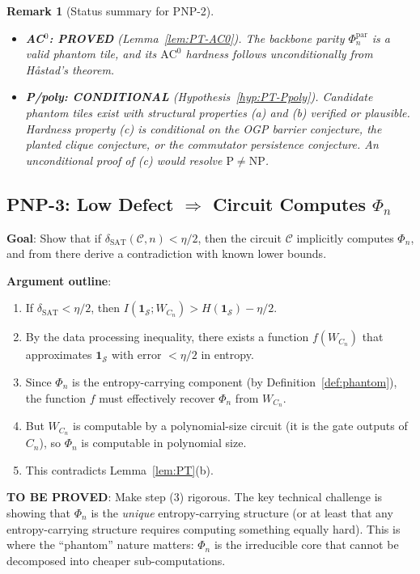 \documentclass[11pt]{article}
\newtheorem{remark}[lemma]{Remark}
\theoremstyle{definition}
\begin{document}
\begin{remark}[Status summary for PNP-2]
\label{rem:PNP2-status}
\begin{itemize}
  \item \textbf{AC$^0$: PROVED} (Lemma~\ref{lem:PT-AC0}).
    The backbone parity $\Phi_n^{\mathrm{par}}$ is a valid phantom tile, and its
    $\mathrm{AC}^0$ hardness follows unconditionally from H\aa{}stad's theorem.
  \item \textbf{P/poly: CONDITIONAL} (Hypothesis~\ref{hyp:PT-Ppoly}).
    Candidate phantom tiles exist with structural properties (a) and (b) verified or
    plausible.  Hardness property (c) is conditional on the OGP barrier conjecture,
    the planted clique conjecture, or the commutator persistence conjecture.
    An unconditional proof of (c) would resolve $\mathrm{P} \neq \mathrm{NP}$.
\end{itemize}
\end{remark}

\subsection{PNP-3: Low Defect $\Rightarrow$ Circuit Computes $\Phi_n$}

\textbf{Goal}: Show that if $\delta_{\mathrm{SAT}}(\mathcal{C}, n) < \eta/2$,
then the circuit $\mathcal{C}$ implicitly computes $\Phi_n$,
and from there derive a contradiction with known lower bounds.

\textbf{Argument outline}:
\begin{enumerate}
  \item If $\delta_{\mathrm{SAT}} < \eta/2$, then $I(\mathbf{1}_{\mathcal{S}} ; W_{C_n}) > H(\mathbf{1}_{\mathcal{S}}) - \eta/2$.
  \item By the data processing inequality, there exists a function $f(W_{C_n})$ that
    approximates $\mathbf{1}_{\mathcal{S}}$ with error $< \eta/2$ in entropy.
  \item Since $\Phi_n$ is the entropy-carrying component (by Definition~\ref{def:phantom}),
    the function $f$ must effectively recover $\Phi_n$ from $W_{C_n}$.
  \item But $W_{C_n}$ is computable by a polynomial-size circuit (it is the gate outputs of $C_n$),
    so $\Phi_n$ is computable in polynomial size.
  \item This contradicts Lemma~\ref{lem:PT}(b).
\end{enumerate}

\textbf{TO BE PROVED}: Make step (3) rigorous.  The key technical challenge is showing that
$\Phi_n$ is the \emph{unique} entropy-carrying structure (or at least that any entropy-carrying
structure requires computing something equally hard).
This is where the ``phantom'' nature matters: $\Phi_n$ is the irreducible core
that cannot be decomposed into cheaper sub-computations.
\end{document}
